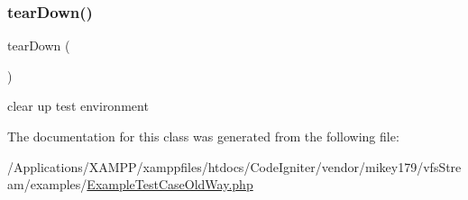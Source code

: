 \subsubsection{\texorpdfstring{tear\+Down()}{tearDown()}}
{\footnotesize\ttfamily tear\+Down (\begin{DoxyParamCaption}{ }\end{DoxyParamCaption})}

clear up test environment 

The documentation for this class was generated from the following file\+:\begin{DoxyCompactItemize}
\item 
/\+Applications/\+X\+A\+M\+P\+P/xamppfiles/htdocs/\+Code\+Igniter/vendor/mikey179/vfs\+Stream/examples/\mbox{\hyperlink{_example_test_case_old_way_8php}{Example\+Test\+Case\+Old\+Way.\+php}}\end{DoxyCompactItemize}
